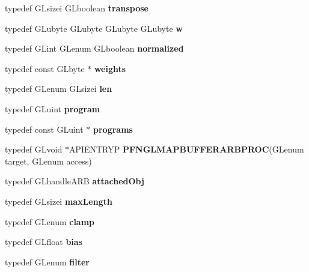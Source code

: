 \begin{DoxyCompactItemize}
\item 
typedef G\+Lsizei G\+Lboolean {\bfseries transpose}\label{_s_d_l__opengl_8h_abddae8e27995e1aa57df4d93edd33803}

\item 
typedef G\+Lubyte G\+Lubyte G\+Lubyte G\+Lubyte {\bfseries w}\label{_s_d_l__opengl_8h_ad47d000a8e40b26a33682e10ae32a1b6}

\item 
typedef G\+Lint G\+Lenum G\+Lboolean {\bfseries normalized}\label{_s_d_l__opengl_8h_a991495bc19f64c176dd83a350b8b1c88}

\item 
typedef const G\+Lbyte $\ast$ {\bfseries weights}\label{_s_d_l__opengl_8h_a3fc6a10c8f7ffa12a6a7855d06ff581d}

\item 
typedef G\+Lenum G\+Lsizei {\bfseries len}\label{_s_d_l__opengl_8h_a508cd9b0e54f044f23b7fc474233693b}

\item 
typedef G\+Luint {\bfseries program}\label{_s_d_l__opengl_8h_ab55c179cd6c84b3f5ddc11d9da0f55b4}

\item 
typedef const G\+Luint $\ast$ {\bfseries programs}\label{_s_d_l__opengl_8h_a36b28b34166ce7bfd72fe771441526a7}

\item 
typedef G\+Lvoid $\ast$A\+P\+I\+E\+N\+T\+R\+Y\+P {\bfseries P\+F\+N\+G\+L\+M\+A\+P\+B\+U\+F\+F\+E\+R\+A\+R\+B\+P\+R\+O\+C}(G\+Lenum target, G\+Lenum access)\label{_s_d_l__opengl_8h_a7c047f4b3f2d64e3c9db43ff8dc5ddbf}

\item 
typedef G\+Lhandle\+A\+R\+B {\bfseries attached\+Obj}\label{_s_d_l__opengl_8h_a284d5062b8beb22ea1fd5e0ee03084ef}

\item 
typedef G\+Lsizei {\bfseries max\+Length}\label{_s_d_l__opengl_8h_a5c0738fe9fcce8c6b2d54e2a3b951a97}

\item 
typedef G\+Lenum {\bfseries clamp}\label{_s_d_l__opengl_8h_a3878d3005eeb2d2ef414abc752ba3c9b}

\item 
typedef G\+Lfloat {\bfseries bias}\label{_s_d_l__opengl_8h_a39c3ffa18f420251c5d132dd8c1c6137}

\item 
typedef G\+Lenum {\bfseries filter}\label{_s_d_l__opengl_8h_ab3664546554b8fc4b0b5a1a981ad97ec}


\end{DoxyCompactItemize}
